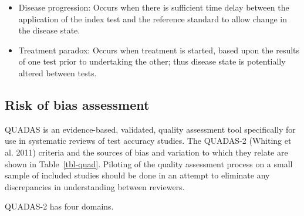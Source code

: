 \documentclass[
  11pt,
  a4paper,
  DIV=11,
  numbers=noendperiod]{scrreprt}
\begin{document}
\begin{itemize}
  \begin{itemize}
  \item
    Disease progression: Occurs when there is sufficient time delay
    between the application of the index test and the reference standard
    to allow change in the disease state.
  \item
    Treatment paradox: Occurs when treatment is started, based upon the
    results of one test prior to undertaking the other; thus disease
    state is potentially altered between tests.
  \end{itemize}
\end{itemize}

\subsection{Risk of bias assessment}\label{risk-of-bias-assessment-2}

QUADAS is an evidence-based, validated, quality assessment tool
specifically for use in systematic reviews of test accuracy studies. The
QUADAS-2 (Whiting et al. 2011) criteria and the sources of bias and
variation to which they relate are shown in Table~\ref{tbl-quad}.
Piloting of the quality assessment process on a small sample of included
studies should be done in an attempt to eliminate any discrepancies in
understanding between reviewers.

QUADAS-2 has four domains.
\end{document}
